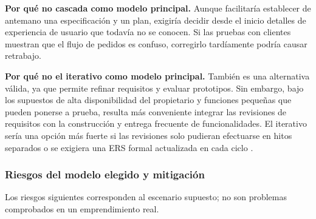 \textbf{Por qué no cascada como modelo principal.} Aunque facilitaría
establecer de antemano una especificación y un plan, exigiría decidir desde
el inicio detalles de experiencia de usuario que todavía no se conocen. Si
las pruebas con clientes muestran que el flujo de pedidos es confuso,
corregirlo tardíamente podría causar retrabajo.

\textbf{Por qué no el iterativo como modelo principal.} También es una
alternativa válida, ya que permite refinar requisitos y evaluar prototipos.
Sin embargo, bajo los supuestos de alta disponibilidad del propietario y
funciones pequeñas que pueden ponerse a prueba, resulta más conveniente
integrar las revisiones de requisitos con la construcción y entrega
frecuente de funcionalidades. El iterativo sería una opción más fuerte si
las revisiones solo pudieran efectuarse en hitos separados o se exigiera
una ERS formal actualizada en cada ciclo \cite{sommerville2016,schon2017}.

\subsubsection{Riesgos del modelo elegido y mitigación}

Los riesgos siguientes corresponden al escenario supuesto; no son problemas
comprobados en un emprendimiento real.

